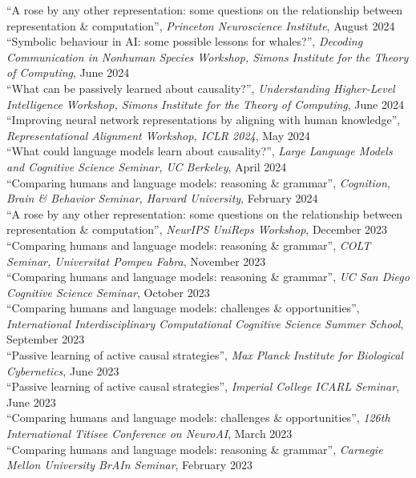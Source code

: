 \documentclass[margin]{res}
\begin{document}
\begin{resume}
{``A rose by any other representation: some questions on the relationship between representation \& computation'',} \textit{Princeton Neuroscience Institute}, August 2024\\[3pt] 
{``Symbolic behaviour in AI: some possible lessons for whales?'',} \textit{Decoding Communication in Nonhuman Species Workshop, Simons Institute for the Theory of Computing}, June 2024\\[3pt]
{``What can be passively learned about causality?'',} \textit{Understanding Higher-Level Intelligence Workshop, Simons Institute for the Theory of Computing}, June 2024
{``Improving neural network representations by aligning with human knowledge'',} \textit{Representational Alignment Workshop, ICLR 2024}, May 2024\\[3pt] 
{``What could language models learn about causality?'',} \textit{Large Language Models and Cognitive Science Seminar, UC Berkeley}, April 2024\\[3pt] 
{``Comparing humans and language models: reasoning \& grammar'',} \textit{Cognition, Brain \& Behavior Seminar, Harvard University}, February 2024\\[3pt] 
{``A rose by any other representation: some questions on the relationship between representation \& computation'',} \textit{NeurIPS UniReps Workshop}, December 2023\\[3pt] 
{``Comparing humans and language models: reasoning \& grammar'',} \textit{COLT Seminar, Universitat Pompeu Fabra}, November 2023\\[3pt] 
{``Comparing humans and language models: reasoning \& grammar'',} \textit{UC San Diego Cognitive Science Seminar}, October 2023\\[3pt] 
{``Comparing humans and language models: challenges \& opportunities'',} \textit{International Interdisciplinary Computational Cognitive Science Summer School}, September 2023\\[3pt] 
{``Passive learning of active causal strategies'',} \textit{Max Planck Institute for Biological Cybernetics}, June 2023\\[3pt]
{``Passive learning of active causal strategies'',} \textit{Imperial College ICARL Seminar}, June 2023\\[3pt]
{``Comparing humans and language models: challenges \& opportunities'',} \textit{126th International Titisee Conference on NeuroAI}, March 2023\\[3pt] 
{``Comparing humans and language models: reasoning \& grammar'',} \textit{Carnegie Mellon University BrAIn Seminar}, February 2023\\[3pt] 

\end{resume}
\end{document}
